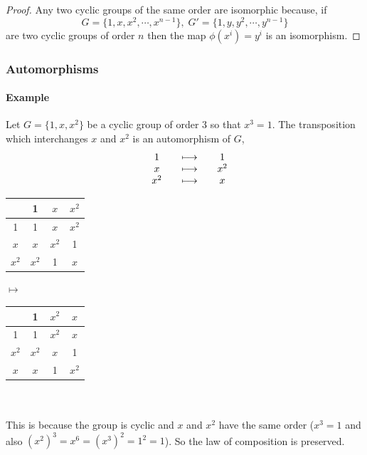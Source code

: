 \documentclass[MathsNotesBase.tex]{subfiles}
\begin{document}
{		
		
		\begin{proof}
			Any two cyclic groups of the same order are isomorphic because, if
			\[ G = \{1, x, x^2, \cdots, x^{n-1}\}, \; G' = \{1, y, y^2, \cdots, y^{n-1}\} \]
			are two cyclic groups of order $n$ then the map $\phi(x^i) = y^i$ is an isomorphism.
		\end{proof}
		
		\subsubsection{Automorphisms}
		\paragraph{Example}
		Let $G = \{1, x, x^2\}$ be a cyclic group of order 3 so that $x^3 = 1$. The transposition which interchanges $x$ and $x^2$ is an automorphism of $G$,
		\[\begin{array}{*6c}
			&1 &&\longmapsto &&1 \\
			&x &&\longmapsto &&x^2 \\
			&x^2 &&\longmapsto &&x \\
		\end{array}\]
		\begin{table}[h!]%
			\centering%
			\begin{tabular}{|c||c|c|c|}
				\hline
				      &  1    & $x$   & $x^2$ \\
				\hline
				\hline
				 1    &  1    & $x$   & $x^2$ \\
				\hline
				$x$   & $x$   & $x^2$ & 1     \\
				\hline
				$x^2$ & $x^2$ & 1     & $x$ \\
				\hline
			\end{tabular}
			$ \longmapsto $
			\begin{tabular}{|c||c|c|c|}
				\hline
				      &  1    & $x^2$ & $x$  \\
				\hline
				\hline
				1     &  1    & $x^2$  & $x$  \\
				\hline
				$x^2$ & $x^2$ & $x$   & 1    \\
				\hline
				$x$   & $x$   & 1     & $x^2$ \\
				\hline
			\end{tabular}
		\end{table}
		\\\\This is because the group is cyclic and $x$ and $x^2$ have the same order ($x^3 = 1$ and also $(x^2)^3 = x^6 = (x^3)^2 = 1^2 = 1$). So the law of composition is preserved.
}
\end{document}
